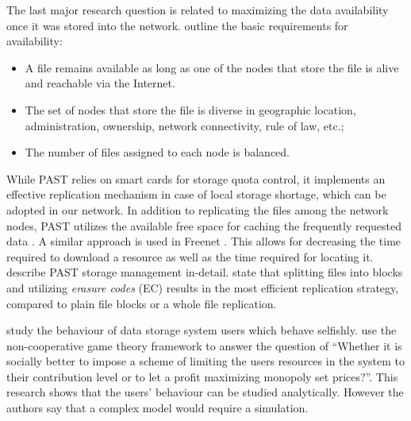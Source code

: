 The last major research question is related to maximizing the data
availability once it was stored into the network.
\citet{past} outline the basic requirements for availability:

\begin{itemize}
\item A file remains available as long as one of the nodes that
      store the file is alive and reachable via the Internet.
\item The set of nodes that store the file is diverse in geographic
      location, administration, ownership, network connectivity, rule
      of law, etc.;
\item The number of files assigned to each node is balanced.
\end{itemize}

While PAST relies on smart cards for storage quota control, it
implements an effective replication mechanism in case of local
storage shortage, which can be adopted in our network. In addition
to replicating the files among the network nodes, PAST utilizes the
available free space for caching the frequently requested data
\citep{past-caching}. A similar approach is used in Freenet
\citep{freenet}. This allows for decreasing the time required to download
a resource as well as the time required for locating it.
\citet{past-caching} describe PAST storage management in-detail.
\citet{p2p-replication-strategy} state that splitting files into
blocks and utilizing \emph{erasure codes} (EC) results in the
most efficient replication strategy, compared to plain file blocks
or a whole file replication.

\citet{selfish-p2p} study the behaviour of \pp data storage system
users which behave selfishly. \citet{selfish-p2p} use the non-cooperative
game theory framework to answer the question of
``Whether it is socially better to
impose a scheme of limiting the users resources in the system
to their contribution level or to let a profit maximizing
monopoly set prices?''. This research shows that the users' behaviour
can be studied analytically. However the authors say that a complex
model would require a simulation.


